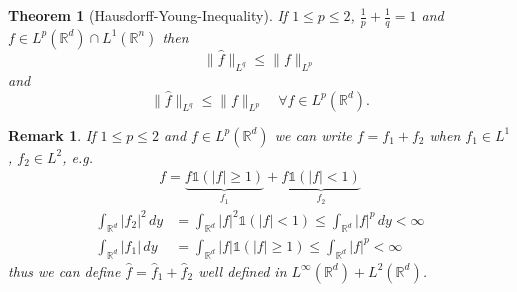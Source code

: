 \documentclass{report}
\theoremstyle{tommy}
\newtheorem{thm}[defn]{Theorem}
\newtheorem{rem}[defn]{Remark}
\begin{document}
  \begin{thm}[Hausdorff-Young-Inequality]\label{hausdorff-young}
    If \(1 \le p \le 2\), \(\frac{1}{p} + \frac{1}{q} = 1\) and \(f \in L^p(\mathbb{R}^d) \cap L^1(\mathbb{R}^n)\) then
    \[\| \hat f \|_{L^{q}} \le \|f\|_{L^p}\]
    and 
    \[\|\hat f\|_{L^q} \le \|f\|_{L^p} \quad \forall f \in L^p(\mathbb{R}^d).\]
  \end{thm}
  
  \begin{rem}
    If \(1 \le p \le 2\) and \(f \in L^p(\mathbb{R}^d)\) we can write \(f = f_1 + f_2\) when \(f_1 \in L^1\), \(f_2 \in L^2\), e.g.
    \begin{align*}
      f = \underbrace{f \mathbb{1}(|f| \ge 1)}_{f_1} + \underbrace{f \mathbb{1}(|f| < 1)}_{f_2}
    \end{align*}
    \begin{align*}
      \int_{\mathbb{R}^d} |f_2|^2 \, dy &= \int_{\mathbb{R}^d}|f|^2 \mathbb{1}(|f| < 1) \le \int_{\mathbb{R}^d} |f|^p \, dy < \infty \\
      \int_{\mathbb{R}^d} |f_1| \, dy &= \int_{\mathbb{R}^d} |f| \mathbb{1}(|f| \ge 1) \le \int_{\mathbb{R}^d} |f|^p < \infty
    \end{align*}
    thus we can define \(\hat f = \hat f_1 + \hat f_2\) well defined in \(L^\infty(\mathbb{R}^d) + L^2(\mathbb{R}^d)\).
  \end{rem}
    
\end{document}
